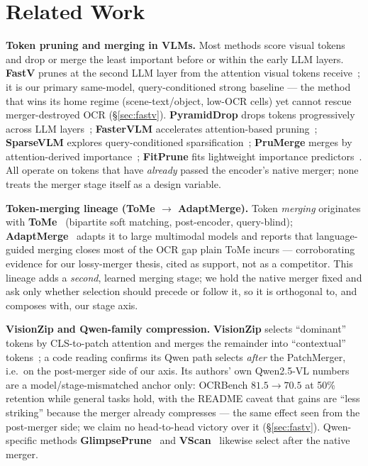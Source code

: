 \documentclass[sigconf,review,anonymous]{acmart}
\begin{document}
\section{Related Work}\label{sec:related}

\textbf{Token pruning and merging in VLMs.} Most methods score visual tokens and
drop or merge the least important before or within the early LLM layers.
\textbf{FastV} prunes at the second LLM layer from the attention visual tokens
receive~\cite{chen2024fastv}; it is our primary same-model, query-conditioned
strong baseline --- the method that wins its home regime (scene-text/object,
low-OCR cells) yet cannot rescue merger-destroyed OCR (\S\ref{sec:fastv}).
\textbf{PyramidDrop} drops tokens progressively across LLM
layers~\cite{xing2024pyramiddrop}; \textbf{FasterVLM} accelerates
attention-based pruning~\cite{zhang2024fastervlm}; \textbf{SparseVLM} explores
query-conditioned sparsification~\cite{zhang2024sparsevlm}; \textbf{PruMerge}
merges by attention-derived importance~\cite{shang2024prumerge};
\textbf{FitPrune} fits lightweight importance
predictors~\cite{ye2024fitprune}. All operate on tokens that have \emph{already}
passed the encoder's native merger; none treats the merger stage itself as a
design variable.

\textbf{Token-merging lineage (ToMe $\to$ AdaptMerge).} Token \emph{merging}
originates with \textbf{ToMe}~\cite{bolya2023tome} (bipartite soft matching,
post-encoder, query-blind); \textbf{AdaptMerge}~\cite{islam2025adaptmerge}
adapts it to large multimodal models and reports that language-guided merging
closes most of the OCR gap plain ToMe incurs --- corroborating evidence for our
lossy-merger thesis, cited as support, not as a competitor. This lineage adds a
\emph{second}, learned merging stage; we hold the native merger fixed and ask
only whether selection should precede or follow it, so it is orthogonal to, and
composes with, our stage axis.

\textbf{VisionZip and Qwen-family compression.} \textbf{VisionZip} selects
``dominant'' tokens by CLS-to-patch attention and merges the remainder into
``contextual'' tokens~\cite{yang2024visionzip}; a code reading confirms its Qwen
path selects \emph{after} the PatchMerger, i.e.\ on the post-merger side of our
axis. Its authors' own Qwen2.5-VL numbers are a model/stage-mismatched anchor
only: OCRBench $81.5 \to 70.5$ at 50\% retention while general tasks hold, with
the README caveat that gains are ``less striking'' because the merger already
compresses --- the same effect seen from the post-merger side; we claim no
head-to-head victory over it (\S\ref{sec:fastv}). Qwen-specific methods
\textbf{GlimpsePrune}~\cite{zeng2025glimpseprune} and
\textbf{VScan}~\cite{zhang2025vscan} likewise select after the native merger.
\end{document}
